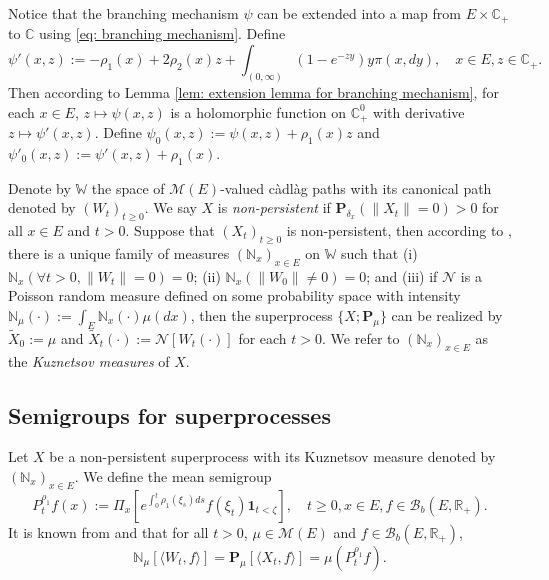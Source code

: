 \documentclass[12pt,a4paper]{amsart}
\theoremstyle{plain}
\theoremstyle{definition}
\numberwithin{equation}{section}
\begin{document}
Notice that the branching mechanism $\psi$ can be extended into a map from $E \times \mathbb C_+$ to $\mathbb C$ using \eqref{eq: branching mechanism}.
Define
\begin{equation}
  \psi'(x,z)
  := - \rho_1(x) + 2\rho_2(x) z + \int_{(0,\infty)} (1-e^{-zy})y\pi(x,dy),
  \quad x\in E, z\in \mathbb C_+.
\end{equation}
Then according to Lemma \ref{lem: extension lemma for branching mechanism}, for each $x \in E$, $z \mapsto \psi(x,z)$ is a holomorphic function on $\mathbb C_+^0$ with derivative $z \mapsto \psi'(x,z)$.
Define $\psi_0(x,z) := \psi(x,z)+ \rho_1(x)z $ and $\psi'_0(x,z) := \psi'(x,z) + \rho_1(x)$.

Denote by $\mathbb W$ the space of $\mathcal M(E)$-valued c\`{a}dl\`{a}g paths with its canonical path denoted by $(W_t)_{t\geq 0}$.
We say $X$ is \emph{non-persistent} if $\mathbf P_{\delta_x}(\|X_t\|= 0) > 0$ for all $x\in E$ and $t> 0$.
Suppose that $(X_t)_{t\geq 0}$ is non-persistent, then according to \cite[Section 8.4]{Li2011Measure-valued}, there is a unique family of measures $(\mathbb N_x)_{x\in E}$ on $\mathbb W$ such that
(i) $\mathbb N_x (\forall t > 0, \|W_t\|=0) =0$; 
(ii) $\mathbb N_x(\|W_0 \|\neq 0) = 0$; 
and (iii) if $\mathcal N$ is a Poisson random measure defined on some probability space with intensity $\mathbb N_\mu(\cdot):= \int_E \mathbb N_x(\cdot )\mu(dx)$, then the superprocess $\{X;\mathbf P_\mu\}$ can be realized by $\widetilde X_0 := \mu$ and $\widetilde X_t(\cdot) := \mathcal N[W_t(\cdot)]$ for each $t>0$.
We refer to $(\mathbb N_x)_{x\in E}$ as the \emph{Kuznetsov measures} of $X$.

\subsection{Semigroups for superprocesses}
\label{sec: definition of vf}
Let $X$ be a non-persistent superprocess with its Kuznetsov measure denoted by $(\mathbb N_x)_{x\in E}$.
We define the mean semigroup
\begin{equation}
  P_t^{\rho_1} f(x)
  := \Pi_{x}[e^{\int_0^t \rho_1(\xi_s)ds}f(\xi_t) \mathbf 1_{t< \zeta}],
  \quad t\geq 0, x\in E, f\in \mathcal B_b(E,\mathbb R_+).
\end{equation}
It is known from \cite[Proposition 2.27]{Li2011Measure-valued} and \cite[Theorem 2.7]{Kyprianou2014Fluctuations} that for all $t > 0$, $\mu \in \mathcal M(E)$ and $f\in \mathcal B_b(E,\mathbb R_+)$,
\begin{equation}
  \label{eq: mean formula for superprocesses}
  \mathbb N_{\mu}[\langle W_t, f\rangle]
  =\mathbf P_{\mu}[\langle X_t, f\rangle]
  =\mu(P^{\rho_1}_t f).
\end{equation}
\end{document}
